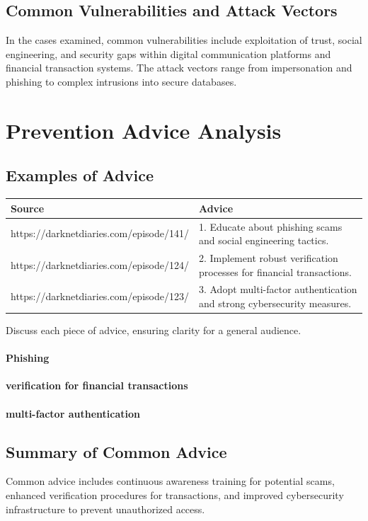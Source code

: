 \documentclass[11pt]{article}
\begin{document}
\subsection{Common Vulnerabilities and Attack Vectors}
In the cases examined, common vulnerabilities include exploitation of trust, social engineering, and security gaps within digital communication platforms and financial transaction systems. The attack vectors range from impersonation and phishing to complex intrusions into secure databases.

\section{Prevention Advice Analysis}
\subsection{Examples of Advice}
\begin{tabular}{@{}ll@{}}
\toprule
\textbf{Source} & \textbf{Advice} \\ \midrule
https://darknetdiaries.com/episode/141/ & 1. Educate about phishing scams and social engineering tactics. \\ 
https://darknetdiaries.com/episode/124/ & 2. Implement robust verification processes for financial transactions. \\
https://darknetdiaries.com/episode/123/ & 3. Adopt multi-factor authentication and strong cybersecurity measures. \\
\bottomrule
\end{tabular}

Discuss each piece of advice, ensuring clarity for a general audience.
\paragraph*{Phishing}
\paragraph*{verification for financial transactions}

\paragraph*{multi-factor authentication}
\subsection{Summary of Common Advice}
Common advice includes continuous awareness training for potential scams, enhanced verification procedures for transactions, and improved cybersecurity infrastructure to prevent unauthorized access.
\end{document}
